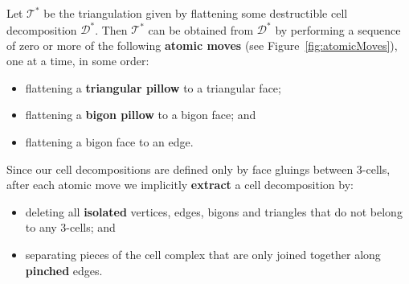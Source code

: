 \documentclass[a4paper,UKenglish,cleveref, autoref, thm-restate]{lipics-v2021}
\newcommand{\tri}{\mathcal{T}}
\begin{document}
\begin{lemma}\label{lem:benCrushing}
Let $\tri^\ast$ be the triangulation given by flattening some destructible cell decomposition $\mathcal{D}^\ast$.
Then $\tri^\ast$ can be obtained from $\mathcal{D}^\ast$ by performing a sequence of
zero or more of the following \textbf{atomic moves} (see Figure~\ref{fig:atomicMoves}), one at a time, in some order:
\begin{itemize}
    \item flattening a \textbf{triangular pillow} to a triangular face;
    \item flattening a \textbf{bigon pillow} to a bigon face; and
    \item flattening a bigon face to an edge.
\end{itemize}
Since our cell decompositions are defined only by face gluings between $3$-cells,
after each atomic move we implicitly \textbf{extract} a cell decomposition by:
\begin{itemize}
    \item deleting all \textbf{isolated} vertices, edges, bigons and triangles that do not belong to any $3$-cells; and
    \item separating pieces of the cell complex that are only joined together along
    \textbf{pinched} edges.
\end{itemize}
\end{lemma}
\end{document}
